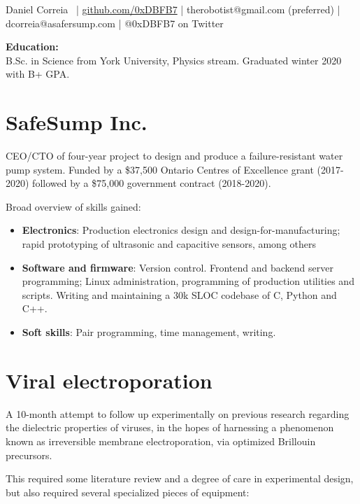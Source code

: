 \documentclass[fleqn,11pt]{article}
\begin{document}
\small{{Daniel Correia}\  | \href{https://github.com/0xDBFB7}{github.com/0xDBFB7} | therobotist@gmail.com ({\footnotesize preferred}) | dcorreia@asafersump.com | @0xDBFB7 on Twitter
\light{\makebox[\linewidth]{\rule{\textwidth}{0.4pt}}}


\begin{multicols}{1}

\begin{tcolorbox}
\textbf{Education:\\}
B.Sc. in Science from York University, Physics stream. Graduated winter 2020 with B+ GPA.
\end{tcolorbox}
%
\section*{SafeSump Inc.}

CEO/CTO of four-year project to design and produce a failure-resistant water pump system. Funded by a \$37,500 Ontario Centres of Excellence grant (2017-2020) followed by a \$75,000 government contract (2018-2020).

Broad overview of skills gained:

\begin{itemize}
	\item \textbf{Electronics}: Production electronics design and design-for-manufacturing; rapid prototyping of ultrasonic and capacitive sensors, among others
	\item \textbf{Software and firmware}: Version control. Frontend and backend server programming; Linux administration, programming of production utilities and scripts. Writing and maintaining a 30k SLOC codebase of C, Python and C++.
	\item \textbf{Soft skills}: Pair programming, time management, writing.
\end{itemize}


\section*{Viral electroporation}

A 10-month attempt to follow up experimentally on previous research regarding the dielectric properties of viruses, in the hopes of harnessing a phenomenon known as irreversible membrane electroporation, via optimized Brillouin precursors.

This required some literature review and a degree of care in experimental design, but also required several specialized pieces of equipment:


\end{multicols}}
\end{document}
